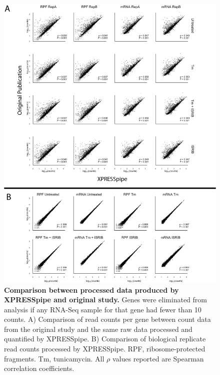 \documentclass[10pt, oneside]{article}
\begin{document}
\begin{figure}
\centering
  \includegraphics[width=160mm]{figures/xpresspipe_figure2.png}
  \caption{\textbf{Comparison between processed data produced by XPRESSpipe and original study.} Genes were eliminated from analysis if any RNA-Seq sample for that gene had fewer than 10 counts. A) Comparison of read counts per gene between count data from the original study and the same raw data processed and quantified by XPRESSpipe. B) Comparison of biological replicate read counts processed by XPRESSpipe. RPF, ribosome-protected fragments. Tm, tunicamycin. All $\rho$ values reported are Spearman correlation coefficients.}
  \label{fig:figure2}
\end{figure}
\end{document}
